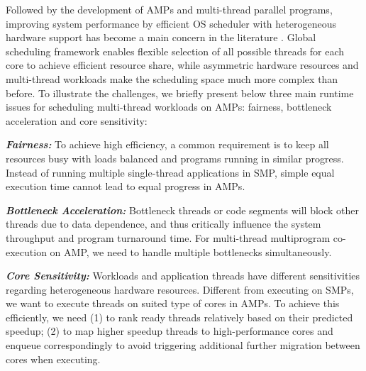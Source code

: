 \documentclass[sigplan,review,anonymous]{acmart}\settopmatter{printfolios=true,printccs=false,printacmref=false}
\begin{document}
Followed by the development of AMPs and multi-thread parallel programs, improving system performance by efficient OS scheduler with heterogeneous hardware support has become a main concern in the literature \cite{mittal2016survey}. Global scheduling framework \cite{jeff2013big} enables flexible selection of all possible threads for each core to achieve efficient resource share, while asymmetric hardware resources and multi-thread workloads make the scheduling space much more complex than before. To illustrate the challenges, we briefly present below three main runtime issues for scheduling multi-thread workloads on AMPs: fairness, bottleneck acceleration and core sensitivity:

\textbf{\textit{Fairness:}} To achieve high efficiency, a common requirement is to keep all resources busy with loads balanced and programs running in similar progress. Instead of running multiple single-thread applications in SMP, simple equal execution time cannot lead to equal progress in AMPs. 

\textbf{\textit{Bottleneck Acceleration:}} Bottleneck threads or code segments will block other threads due to data dependence, and thus critically influence the system throughput and program turnaround time. For multi-thread multiprogram co-execution on AMP, we need to handle multiple bottlenecks simultaneously.  

\textbf{\textit{Core Sensitivity:}} Workloads and application threads have different sensitivities regarding heterogeneous hardware resources. Different from executing on SMPs, we want to execute threads on suited type of cores in AMPs. To achieve this efficiently, we need (1) to rank ready threads relatively based on their predicted speedup; (2) to map higher speedup threads to high-performance cores and enqueue correspondingly to avoid triggering additional further migration between cores when executing.
\end{document}
